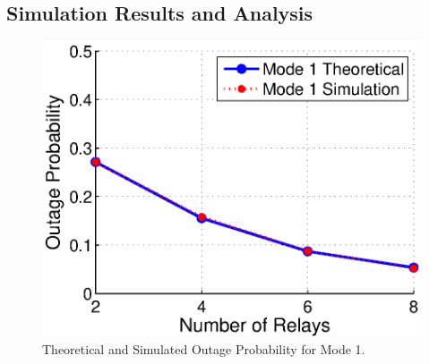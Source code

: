 \subsection{Simulation Results and Analysis}
\begin{figure}
\centering
\includegraphics[width=12cm]{theo_vs_simu_V2.eps}
\caption{Theoretical and Simulated Outage Probability for Mode 1.}
\label{theovssimu}
\end{figure}

